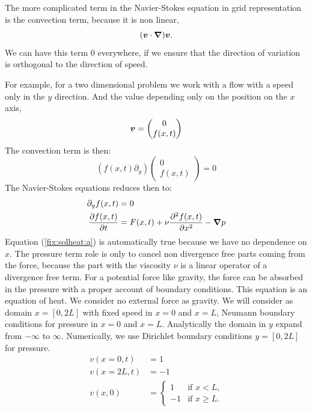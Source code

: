 The more complicated term in the Navier-Stokes equation in grid representation is the convection term, because it is non linear,
\begin{equation}
	({\boldsymbol {v}}\cdot {\boldsymbol {\nabla}}){\boldsymbol {v}}.
\end{equation}
We can have this term $0$ everywhere, if we ensure that the direction of variation is orthogonal to the direction of speed.

For example, for a two dimensional problem we work with a flow with a speed only in the $y$ direction. And the value depending only on the position on the $x$ axis,
\begin{equation}
	{\boldsymbol {v}}=\begin{pmatrix}
	         	0\\f(x,t)
	         \end{pmatrix}
\end{equation}
The convection term is then:
\begin{equation}
	(f(x,t)\partial_{y})\begin{pmatrix}
	         	0\\f(x,t)
	         \end{pmatrix}=0
\end{equation}
The Navier-Stokes equations reduces then to:
\begin{align}
\label{fix:solheat:a}
	\partial_{y}f(x,t)&=0\\
	\frac{\partial f(x,t)}{\partial t}&=F(x,t)+\nu\frac{\partial^2 f(x,t)}{\partial x^2}-{\boldsymbol {\nabla}}p
\end{align}
Equation (\ref{fix:solheat:a}) is automatically true because we have no dependence on $x$.
The pressure term role is only to cancel non divergence free parts coming from the force, because the part with the viscosity $\nu$ is a linear operator
of a divergence free term.
For a potential force like gravity, the force can be absorbed in the pressure with a proper account of boundary conditions.
This equation is an equation of heat.
We consider no external force as gravity.
We will consider as domain $x=[0,2L]$ with fixed speed in $x=0$ and $x=L$,  Neumann boundary conditions for pressure in $x=0$ and $x=L$.
Analytically the domain in $y$ expand from $-\infty$ to $\infty$. Numerically, we use Dirichlet boundary conditions $y=[0,2L]$ for pressure.
\begin{align*}
    v(x=0,t)&=1\\
    v(x=2L,t)&=-1\\
    v(x,0)&=\begin{cases}
             1&\text{if $x<L$,}\\
             -1& \text{if $x\geq L$.}
            \end{cases}
\end{align*}

